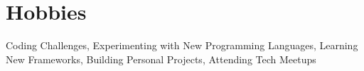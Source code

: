 
\section{Hobbies}
\resumeSubHeadingListStart
\small{
    \item{Coding Challenges, Experimenting with New Programming Languages, Learning New Frameworks, Building Personal Projects, Attending Tech Meetups}
}
\resumeSubHeadingListEnd
